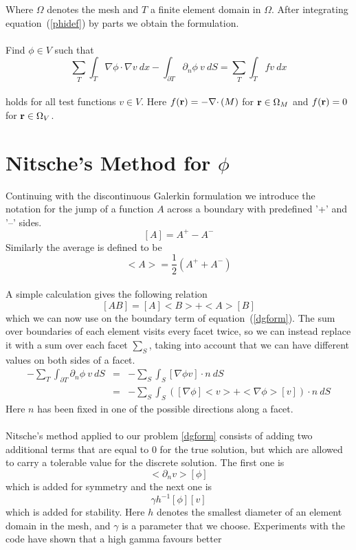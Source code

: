 \documentclass[12pt,a4paper,notitlepage]{article}
\begin{document}
\noindent Where $\Omega$ denotes the mesh and $T$ a finite element domain in $\Omega$. After integrating
equation~(\ref{phidef}) by parts we obtain the formulation.
\\
\\
Find $\phi \in V$ such that
\begin{equation}\label{dgform}  
 \sum_T \int_T \nabla \phi \cdotp \nabla v \ dx - \int_{\partial T} \partial_n \phi \  v \ dS = \sum_T \int_T fv \ dx
\end{equation}
 \\
holds for all test functions $v \in V $. Here $f(\mathbf{r}) = - \nabla \cdotp (M)$ for $\mathbf{r} \in \Omega_M$ and $f(\mathbf{r}) = 0$
for $\mathbf{r} \in \Omega_V$.

\section{Nitsche's Method for $\phi$}
Continuing with the discontinuous Galerkin formulation we introduce the notation for the jump
of a function $A$ across a boundary with predefined '+' and '--' sides. 
\[ [A] = A^+ - A^- \]
Similarly the average is defined to be
\[ <A> = \frac{1}{2} (A^+ + A^-) \]
\\
A simple calculation gives the following relation
\[ [AB] = [A]<B> + <A>[B] \]
which we can now use on the boundary term of equation~(\ref{dgform}). The sum over boundaries of each element 
visits every facet twice, so we can instead replace it with a sum over each facet $\sum_S$, taking into account that
we can have different values on both sides of a facet. 
\begin{eqnarray*}
- \sum_T \int_{\partial T} \partial_n \phi \  v \ dS &=&  - \sum_S \int_S [\nabla \phi v ] \cdotp n \ dS \\
&=&  - \sum_S \int_S ( [\nabla \phi] <v> + <\nabla \phi> [v]) \cdotp n \ dS
\end{eqnarray*}
Here $n$ has been fixed in one of the possible directions along a facet. 
\\
\\
Nitsche's method applied to our problem \ref{dgform} consists of adding two additional terms that are equal to 0 
for the true solution, but which are allowed to carry a tolerable value for the discrete solution.
The first one is
\[ <\partial_n v> [\phi] \]
which is added for symmetry and the next one is
\[\gamma h^{-1} [\phi][v] \]
which is added for stability. Here $h$ denotes the smallest diameter of an element domain in the mesh, and
$\gamma$ is a parameter that we choose. Experiments with the code have shown that a high gamma favours better
\end{document}
